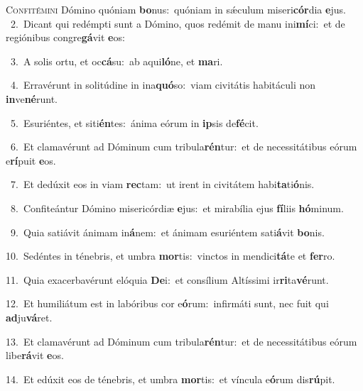 \lettrine{\initial\textcolor{\initialcolor}{C}}{onfitémini} Dómino quóniam \textbf{bo}\-nus:~\star quóniam in sǽculum miseri\-\textbf{cór}\-dia \textbf{e}\-jus.\\
{\numbfont\textcolor{\numbcolor}{~2.}}~Dicant qui redémpti sunt a Dómino, quos redémit de manu ini\-\textbf{mí}\-ci:~\star et de regiónibus congre\-\textbf{gá}\-vit \textbf{e}\-os:\par
{\numbfont\textcolor{\numbcolor}{~3.}}~A solis ortu, et oc\-\textbf{cá}\-su:~\star ab aqui\-\textbf{ló}\-ne, et \textbf{ma}\-ri.\par
{\numbfont\textcolor{\numbcolor}{~4.}}~Erravérunt in solitúdine in ina\-\textbf{quó}\-so:~\star viam civitátis habitáculi non \textbf{in}\-ve\-\textbf{né}\-runt.\par
{\numbfont\textcolor{\numbcolor}{~5.}}~Esuriéntes, et siti\-\textbf{én}\-tes:~\star ánima eórum in \textbf{ip}\-sis de\-\textbf{fé}\-cit.\par
{\numbfont\textcolor{\numbcolor}{~6.}}~Et clamavérunt ad Dóminum cum tribula\-\textbf{rén}\-tur:~\star et de necessitátibus eórum e\-\textbf{rí}\-puit \textbf{e}\-os.\par
{\numbfont\textcolor{\numbcolor}{~7.}}~Et dedúxit eos in viam \textbf{rec}\-tam:~\star ut irent in civitátem habi\-\textbf{ta}\-ti\-\textbf{ó}\-nis.\par
{\numbfont\textcolor{\numbcolor}{~8.}}~Confiteántur Dómino misericórdiæ \textbf{e}\-jus:~\star et mirabília ejus \textbf{fí}\-liis \textbf{hó}\-minum.\par
{\numbfont\textcolor{\numbcolor}{~9.}}~Quia satiávit ánimam in\-\textbf{á}\-nem:~\star et ánimam esuriéntem sati\-\textbf{á}\-vit \textbf{bo}\-nis.\par
{\numbfont\textcolor{\numbcolor}{10.}}~Sedéntes in ténebris, et umbra \textbf{mor}\-tis:~\star vinctos in mendici\-\textbf{tá}\-te et \textbf{fer}\-ro.\par
{\numbfont\textcolor{\numbcolor}{11.}}~Quia exacerbavérunt elóquia \textbf{De}\-i:~\star et consílium Altíssimi ir\-\textbf{ri}\-ta\-\textbf{vé}\-runt.\par
{\numbfont\textcolor{\numbcolor}{12.}}~Et humiliátum est in labóribus cor e\-\textbf{ó}\-rum:~\star infirmáti sunt, nec fuit qui \textbf{ad}\-ju\-\textbf{vá}\-ret.\par
{\numbfont\textcolor{\numbcolor}{13.}}~Et clamavérunt ad Dóminum cum tribula\-\textbf{rén}\-tur:~\star et de necessitátibus eórum libe\-\textbf{rá}\-vit \textbf{e}\-os.\par
{\numbfont\textcolor{\numbcolor}{14.}}~Et edúxit eos de ténebris, et umbra \textbf{mor}\-tis:~\star et víncula e\-\textbf{ó}\-rum dis\-\textbf{rú}\-pit.\par
